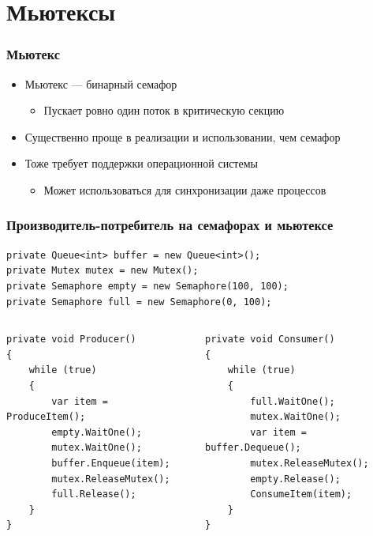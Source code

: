 \documentclass{../../slides-style}
\begin{document}
    \section{Мьютексы}

    \begin{frame}
        \frametitle{Мьютекс}
        \begin{itemize}
            \item Мьютекс --- бинарный семафор
            \begin{itemize}
                \item Пускает ровно один поток в критическую секцию
            \end{itemize}
            \item Существенно проще в реализации и использовании, чем семафор
            \item Тоже требует поддержки операционной системы
            \begin{itemize}
                \item Может использоваться для синхронизации даже процессов
            \end{itemize}
        \end{itemize}
    \end{frame}

    \begin{frame}[fragile]
        \frametitle{Производитель-потребитель на семафорах и мьютексе}
        \begin{footnotesize}
            \begin{verbatim}
private Queue<int> buffer = new Queue<int>();
private Mutex mutex = new Mutex();
private Semaphore empty = new Semaphore(100, 100);
private Semaphore full = new Semaphore(0, 100);
            \end{verbatim}
            \begin{columns}
                \begin{column}{0.5\textwidth}
                    \begin{verbatim}
private void Producer()
{
    while (true)
    {
        var item = ProduceItem();
        empty.WaitOne();
        mutex.WaitOne();
        buffer.Enqueue(item);
        mutex.ReleaseMutex();
        full.Release();
    }
}
                    \end{verbatim}
                \end{column}
                \begin{column}{0.5\textwidth}
                    \begin{verbatim}
private void Consumer()
{
    while (true)
    {
        full.WaitOne();
        mutex.WaitOne();
        var item = buffer.Dequeue();
        mutex.ReleaseMutex();
        empty.Release();
        ConsumeItem(item);
    }
}
                    \end{verbatim}
                \end{column}
            \end{columns}
        \end{footnotesize}
    \end{frame}
\end{document}
